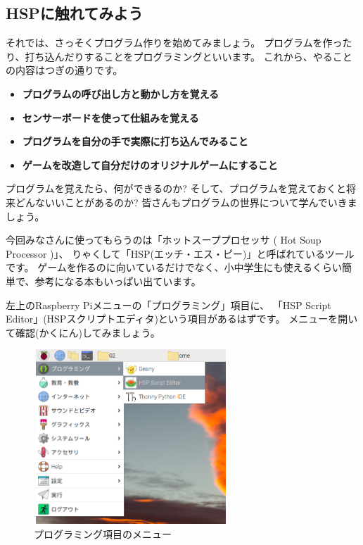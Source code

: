 % 
% 
% 
\subsection{HSPに触れてみよう}

それでは、さっそくプログラム作りを始めてみましょう。
プログラムを作ったり、打ち込んだりすることをプログラミングといいます。
これから、やることの内容はつぎの通りです。

\begin{itemize}
  \item \textbf{プログラムの呼び出し方と動かし方を覚える}
  \item \textbf{センサーボードを使って仕組みを覚える}
  \item \textbf{プログラムを自分の手で実際に打ち込んでみること}
  \item \textbf{ゲームを改造して自分だけのオリジナルゲームにすること}
\end{itemize}

プログラムを覚えたら、何ができるのか?
そして、プログラムを覚えておくと将来どんないいことがあるのか?
皆さんもプログラムの世界について学んでいきましょう。

今回みなさんに使ってもらうのは「ホットスーププロセッサ ( Hot Soup Processor )」、
りゃくして「HSP(エッチ・エス・ピー)」と呼ばれているツールです。
ゲームを作るのに向いているだけでなく、小中学生にも使えるくらい簡単で、参考になる本もいっぱい出ています。

左上のRaspberry Piメニューの「プログラミング」項目に、
「HSP Script Editor」(HSPスクリプトエディタ)という項目があるはずです。
メニューを開いて確認(かくにん)してみましょう。

\begin{figure}[H]
  \begin{center}
    \includegraphics[keepaspectratio,width=7.31cm,height=6.562cm]{images/chap02/s_hspmenu.png}
    \caption{プログラミング項目のメニュー}
  \end{center}
  \label{fig:hsp_menu}
\end{figure}

